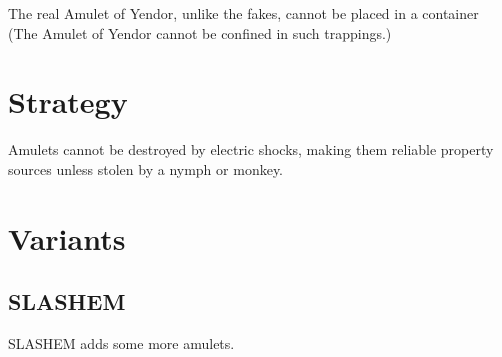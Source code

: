 The real Amulet of Yendor, unlike the fakes, cannot be placed in a container (The Amulet of Yendor cannot be confined in such trappings.)



\section{Strategy}
\label{5}
Amulets cannot be destroyed by electric shocks\footnotemark[81], making them reliable property sources unless stolen by a nymph\footnotemark[82] or monkey\footnotemark[83].



\section{Variants}
\label{6}
\subsection{SLASH\textquotesingle{}EM}
\label{7}
SLASH\textquotesingle{}EM\footnotemark[84] adds some more amulets.




